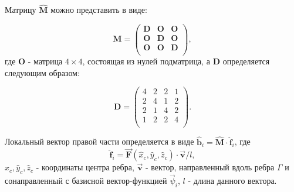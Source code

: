 Матрицу $\hat{\textbf{M}}$ можно представить в виде:

\begin{equation*}
	\textbf{M} = \left(
	\begin{array}{ccc}
		\textbf{D} & \textbf{O} & \textbf{O}\\
		\textbf{O} & \textbf{D} & \textbf{O}\\
		\textbf{O} & \textbf{O} & \textbf{D} \\
	\end{array}
	\right),
\end{equation*}
где $\textbf{O}$ - матрица $4 \times 4$, состоящая из нулей подматрица, а $\textbf{D}$ определяется следующим образом:

\begin{equation*}
	\textbf{D} = \left(
	\begin{array}{rrrr}
		4 & 2 & 2 & 1 \\
		2 & 4 & 1 & 2 \\
		2 & 1 & 4 & 2 \\
		1 & 2 & 2 & 4 \\
	\end{array}
	\right).
\end{equation*}

Локальный вектор правой части определяется в виде $\hat{\textbf{b}}_i = \hat{\textbf{M}} \cdot \hat{\textbf{f}}_i$, где 
\begin{equation} \label{eq_1_17}
\hat{\textbf{f}}_i = \overrightarrow{\textbf{F}}(\hat{x}_c, \hat{y}_c, \hat{z}_c) \cdot \overrightarrow{\textbf{v}} / l,
\end{equation}
$\hat{x}_c, \hat{y}_c, \hat{z}_c$ - координаты центра ребра, $\overrightarrow{\textbf{v}}$ - вектор, направленный вдоль ребра $\Gamma$ и сонаправленный с базисной вектор-функцией $\overrightarrow{\psi}_i$, $l$ - длина данного вектора.
